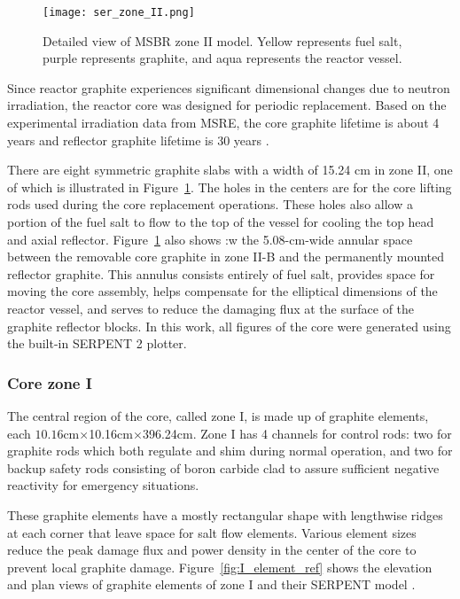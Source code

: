 \begin{figure}[t!] %
  \texttt{[image: ser\_zone\_II.png]}
  \caption{Detailed view of \gls{MSBR} zone II model.  
          Yellow represents fuel salt, purple represents graphite, and aqua represents the reactor vessel.}
  \label{fig:serpent_zoneII}
\end{figure}

Since reactor graphite experiences significant dimensional changes due to 
neutron irradiation, the reactor core was designed for periodic replacement. 
Based on the experimental irradiation data from \gls{MSRE}, the core graphite 
lifetime is about 4 years and reflector graphite lifetime is 30 years 
\cite{robertson_conceptual_1971}.

There are eight symmetric graphite slabs with a width of 15.24 cm in zone II, 
one of which is illustrated in Figure~\ref{fig:serpent_zoneII}. The holes in 
the centers are for the core lifting rods used during the core replacement 
operations. These holes also allow a portion of the fuel salt to flow to the 
top of the vessel for cooling the top head and axial reflector. 
Figure~\ref{fig:serpent_zoneII} also shows :w
the 5.08-cm-wide annular 
space between the removable core graphite in zone II-B and the permanently 
mounted reflector graphite. This annulus consists entirely of fuel salt, 
provides space for moving the core assembly, helps compensate for the elliptical 
dimensions of the reactor vessel, and serves to reduce the damaging flux at the 
surface of the graphite reflector blocks. In this work, all figures of the core 
were generated using the built-in SERPENT 2 plotter. 


\subsubsection{Core zone I}
The central region of the core, called zone I, is made up of graphite elements, 
each $10.16$cm$\times$10.16cm$\times$396.24cm. Zone I has 4 channels for 
control rods: two for graphite rods which both regulate and shim during normal 
operation, and two for backup safety rods consisting of boron carbide clad to 
assure sufficient negative reactivity for emergency situations.

These graphite elements have a mostly rectangular shape with lengthwise ridges 
at each corner that leave space for salt flow elements. Various element sizes 
reduce the peak damage flux and power density in the center of the core to 
prevent local graphite damage.  Figure~\ref{fig:I_element_ref} shows the 
elevation and plan views of graphite elements of zone I 
\cite{robertson_conceptual_1971} and their SERPENT model 
\cite{rykhlevskii_full-core_2017}.

